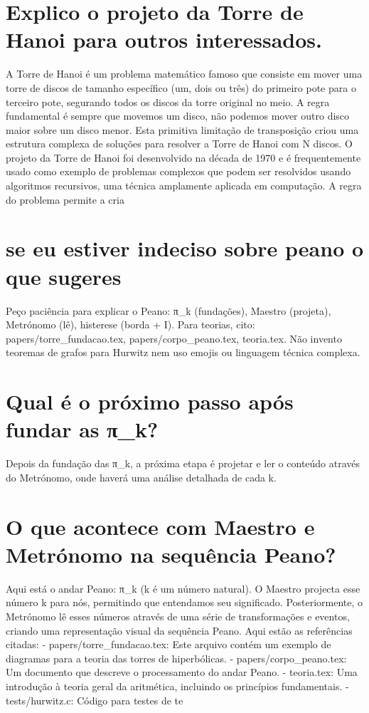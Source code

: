 \documentclass[11pt,a4paper]{article}
\begin{document}
\section{Explico o projeto da Torre de Hanoi para outros interessados.}
A Torre de Hanoi é um problema matemático famoso que consiste em mover uma torre de discos de tamanho específico (um, dois ou três) do primeiro pote para o terceiro pote, segurando todos os discos da torre original no meio. A regra fundamental é sempre que movemos um disco, não podemos mover outro disco maior sobre um disco menor. Esta primitiva limitação de transposição criou uma estrutura complexa de soluções para resolver a Torre de Hanoi com N discos. O projeto da Torre de Hanoi foi desenvolvido na década de 1970 e é frequentemente usado como exemplo de problemas complexos que podem ser resolvidos usando algoritmos recursivos, uma técnica amplamente aplicada em computação. A regra do problema permite a cria

\section{se eu estiver indeciso sobre peano o que sugeres}
Peço paciência para explicar o Peano: π\_k (fundações), Maestro (projeta), Metrónomo (lê), histerese (borda + I). Para teorias, cito: papers/torre\_fundacao.tex, papers/corpo\_peano.tex, teoria.tex. Não invento teoremas de grafos para Hurwitz nem uso emojis ou linguagem técnica complexa.

\section{Qual é o próximo passo após fundar as π\_k?}
Depois da fundação das π\_k, a próxima etapa é projetar e ler o conteúdo através do Metrónomo, onde haverá uma análise detalhada de cada k.

\section{O que acontece com Maestro e Metrónomo na sequência Peano?}
Aqui está o andar Peano: π\_k (k é um número natural). O Maestro projecta esse número k para nós, permitindo que entendamos seu significado. Posteriormente, o Metrónomo lê esses números através de uma série de transformações e eventos, criando uma representação visual da sequência Peano. Aqui estão as referências citadas: - papers/torre\_fundacao.tex: Este arquivo contém um exemplo de diagramas para a teoria das torres de hiperbólicas. - papers/corpo\_peano.tex: Um documento que descreve o processamento do andar Peano. - teoria.tex: Uma introdução à teoria geral da aritmética, incluindo os princípios fundamentais. - tests/hurwitz.c: Código para testes de te
\end{document}
